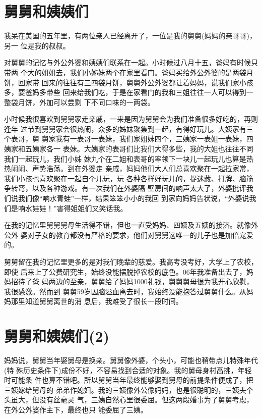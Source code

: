 \documentclass[12pt]{book}
\begin{document}
\section{舅舅和姨姨们}
\label{sec-9-17}

我呆在美国的五年里，有两位亲人已经离开了，一位是我的舅舅(妈妈的亲哥哥)，另一
位是我的叔叔。

对舅舅的记忆与外公外婆和姨姨们联系在一起。小时候过八月十五，爸妈有时候只带两
个大的姐姐去，我们小姊妹两个在家里看门。爸妈买给外公外婆的是两袋月饼，回家带
回来的往往有三四袋月饼，舅舅外公外婆都让着妈妈，说我们家小孩多，要爸妈多带些
回来给我们吃，于是在家看门的我和三姐往往一人可以得到一整袋月饼，外加可以尝剩
下不同口味的一两袋。

小时候我很喜欢到舅舅家走亲戚，一来是因为舅舅会为我们准备很多好吃的，再则逢年
过节到舅舅家会很热闹，众多的姊妹聚集到一起，有得好玩儿。大姨家有三个表哥，舅
舅家我有一表哥一表妹，我们家姐妹四个，三姨家一表姐一表妹，四姨家和五姨家各一
表妹。大姨家的表哥们比我们大得多些，我的大姐也往往不同我们一起玩儿，我们小姊
妹九个在二姐和表哥的率领下一块儿一起玩儿也算是热热闹闹、声势浩荡。到在外婆走
亲戚，妈妈他们大人们总喜欢聚在一起拉家常，我们小孩也喜欢聚在一起自个儿玩，玩
各种各样好玩儿的，捉迷藏、打牌、脑筋争转弯，以及各种游戏。有一次我们在外婆隔
壁房间的响声太大了，外婆批评我们说我们像“响水青蛙”一样，结果笨笨小小的我回
到家向妈妈告状说，“外婆说我们是响水娃娃！”害得姐姐们又笑话我。

在我的记忆里舅舅舅母生活得不错，但也一直受妈妈、四姨及五姨的接济。就像外公外
婆对子女的教育都没有严格的要求，他们对舅舅这唯一的儿子也是加倍宠爱的。

舅舅留在我的记忆里更多的是对我们晚辈的慈爱。我高考没考好，大学上了农校，即使
后来上了公费研究生，始终没能摆脱掉农校的底色。06年我准备出去了，妈妈招待了爸
妈两边的至亲，舅舅给了妈妈1000礼钱，舅舅舅母很为我开心欣慰，我很感激。然而到
舅舅59岁因脑溢血离去时，我始终没能抱答过舅舅什么。从妈妈那里知道舅舅离世的消
息后，我难受了很长一段时间。
\section{舅舅和姨姨们(2)}
\label{sec-9-18}

妈妈说，舅舅当年娶舅母是换亲。舅舅像外婆，个头小，可能也稍带点儿特殊年代(特
殊历史条件下)成份不好，不容易找到合适的对象。我的舅母身村高挑，年轻时可能条
件也算不错吧。所以舅舅当年最终能够娶到舅母的前提条件便成了，把三姨嫁给舅母的
弟弟作媳妇。我的三姨像外公像妈妈，也是很聪明的，三姨夫个头虽大，但没有丝毫灵
气，三姨自然心里很委屈。但这两段婚事为了舅舅考虑，在外公外婆作主下，最终也只
能委屈了三姨。
\end{document}
